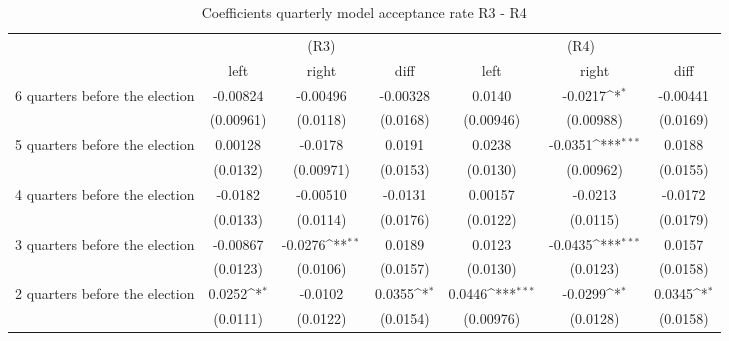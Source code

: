 \begin{table}[!ht]\centering \footnotesize
\def\sym#1{\ifmmode^{#1}\else\(^{#1}\)\fi}
\caption{Coefficients quarterly model acceptance rate R3 - R4}
\begin{tabular}{l*{6}{c}}
\hline\hline
                    &\multicolumn{3}{c}{(R3)}&\multicolumn{3}{c}{(R4)}\\
&\multicolumn{1}{c}{left}&\multicolumn{1}{c}{right}&\multicolumn{1}{c}{diff}&\multicolumn{1}{c}{left}&\multicolumn{1}{c}{right}&\multicolumn{1}{c}{diff}\\
\hline
 6 quarters before the election&    -0.00824         &    -0.00496         &    -0.00328         &      0.0140         &     -0.0217\sym{*}  &    -0.00441         \\
                    &   (0.00961)         &    (0.0118)         &    (0.0168)         &   (0.00946)         &   (0.00988)         &    (0.0169)         \\
[0,5em]
 5 quarters before the election&     0.00128         &     -0.0178         &      0.0191         &      0.0238         &     -0.0351\sym{***}&      0.0188         \\
                    &    (0.0132)         &   (0.00971)         &    (0.0153)         &    (0.0130)         &   (0.00962)         &    (0.0155)         \\
[0,5em]
 4 quarters before the election&     -0.0182         &    -0.00510         &     -0.0131         &     0.00157         &     -0.0213         &     -0.0172         \\
                    &    (0.0133)         &    (0.0114)         &    (0.0176)         &    (0.0122)         &    (0.0115)         &    (0.0179)         \\
[0,5em]
 3 quarters before the election&    -0.00867         &     -0.0276\sym{**} &      0.0189         &      0.0123         &     -0.0435\sym{***}&      0.0157         \\
                    &    (0.0123)         &    (0.0106)         &    (0.0157)         &    (0.0130)         &    (0.0123)         &    (0.0158)         \\
[0,5em]
 2 quarters before the election&      0.0252\sym{*}  &     -0.0102         &      0.0355\sym{*}  &      0.0446\sym{***}&     -0.0299\sym{*}  &      0.0345\sym{*}  \\
                    &    (0.0111)         &    (0.0122)         &    (0.0154)         &   (0.00976)         &    (0.0128)         &    (0.0158)         \\

\end{tabular}
\end{table}
